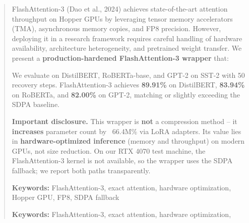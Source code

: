 \documentclass{article}
\begin{document}
\maketitle

\begin{abstract}
FlashAttention-3 (Dao et al., 2024) achieves state-of-the-art attention 
throughput on Hopper GPUs by leveraging tensor memory accelerators (TMA), 
asynchronous memory copies, and FP8 precision. However, deploying it in a 
research framework requires careful handling of hardware availability, 
architecture heterogeneity, and pretrained weight transfer. We present a 
\textbf{production-hardened FlashAttention-3 wrapper} that:

We evaluate on DistilBERT, RoBERTa-base, and GPT-2 on SST-2 with 
50 recovery steps. FlashAttention-3 achieves \textbf{89.91\%} 
on DistilBERT, \textbf{83.94\%} on RoBERTa, and \textbf{82.00\%} on GPT-2, 
matching or slightly exceeding the SDPA baseline.

\textbf{Important disclosure.} This wrapper is \textbf{not} a compression method -- it 
\textbf{increases} parameter count by ~66.4M\% via LoRA adapters. Its 
value lies in \textbf{hardware-optimized inference} (memory and throughput) on 
modern GPUs, not size reduction. On our RTX 4070 test machine, the 
FlashAttention-3 kernel is not available, so the wrapper uses the SDPA 
fallback; we report both paths transparently.

\textbf{Keywords:} FlashAttention-3, exact attention, hardware optimization, 
Hopper GPU, FP8, SDPA fallback



\vspace{0.5em}
\noindent\textbf{Keywords:} FlashAttention-3, exact attention, hardware optimization,
\end{abstract}
\end{document}
